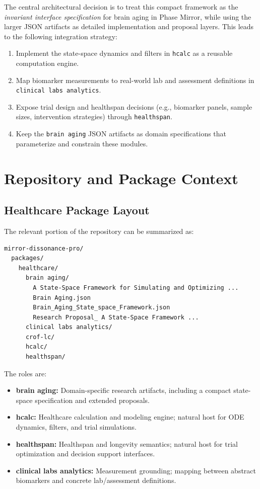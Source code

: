 \documentclass[11pt]{article}
\begin{document}
The central architectural decision is to treat this compact framework as the
\emph{invariant interface specification} for brain aging in Phase Mirror, while using
the larger JSON artifacts as detailed implementation and proposal layers. This leads
to the following integration strategy:
\begin{enumerate}[noitemsep]
  \item Implement the state-space dynamics and filters in \texttt{hcalc} as a reusable
        computation engine.
  \item Map biomarker measurements to real-world lab and assessment definitions in
        \texttt{clinical labs analytics}.
  \item Expose trial design and healthspan decisions (e.g., biomarker panels, sample
        sizes, intervention strategies) through \texttt{healthspan}.
  \item Keep the \texttt{brain aging} JSON artifacts as domain specifications that
        parameterize and constrain these modules.
\end{enumerate}

\section{Repository and Package Context}

\subsection{Healthcare Package Layout}

The relevant portion of the repository can be summarized as:
\begin{verbatim}
mirror-dissonance-pro/
  packages/
    healthcare/
      brain aging/
        A State-Space Framework for Simulating and Optimizing ...
        Brain Aging.json
        Brain_Aging_State_space_Framework.json
        Research Proposal_ A State-Space Framework ...
      clinical labs analytics/
      crof-lc/
      hcalc/
      healthspan/
\end{verbatim}

The roles are:
\begin{itemize}[noitemsep]
  \item \textbf{brain aging:} Domain-specific research artifacts, including a compact
        state-space specification and extended proposals.
  \item \textbf{hcalc:} Healthcare calculation and modeling engine; natural host for
        ODE dynamics, filters, and trial simulations.
  \item \textbf{healthspan:} Healthspan and longevity semantics; natural host for
        trial optimization and decision support interfaces.
  \item \textbf{clinical labs analytics:} Measurement grounding; mapping between
        abstract biomarkers and concrete lab/assessment definitions.
\end{itemize}
\end{document}
